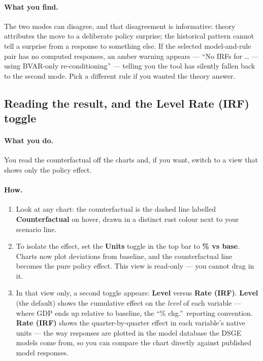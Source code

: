\documentclass[11pt]{article}
\theoremstyle{definition}
\theoremstyle{remark}
\begin{document}
\paragraph{What you find.} The two modes can disagree, and that disagreement
is informative: theory attributes the move to a deliberate policy surprise;
the historical pattern cannot tell a surprise from a response to something
else. If the selected model-and-rule pair has no computed responses, an amber
warning appears --- ``No IRFs for \ldots{} --- using BVAR-only
re-conditioning'' --- telling you the tool has silently fallen back to the
second mode. Pick a different rule if you wanted the theory answer.

\subsection{Reading the result, and the Level \textbar{} Rate (IRF) toggle}

\paragraph{What you do.} You read the counterfactual off the charts and, if
you want, switch to a view that shows only the policy effect.

\paragraph{How.}
\begin{enumerate}
  \item Look at any chart: the counterfactual is the dashed line labelled
    \textbf{Counterfactual} on hover, drawn in a distinct rust colour next to
    your scenario line.
  \item To isolate the effect, set the \textbf{Units} toggle in the top bar to
    \textbf{\% vs base}. Charts now plot deviations from baseline, and the
    counterfactual line becomes the pure policy effect. This view is
    read-only --- you cannot drag in it.
  \item In that view only, a second toggle appears: \textbf{Level} versus
    \textbf{Rate (IRF)}. \textbf{Level} (the default) shows the cumulative
    effect on the \emph{level} of each variable --- where GDP ends up
    relative to baseline, the ``\% chg.''\ reporting convention.
    \textbf{Rate (IRF)} shows the quarter-by-quarter effect in each
    variable's native units --- the way responses are plotted in the model
    database the DSGE models come from, so you can compare the chart directly
    against published model responses.
\end{enumerate}
\end{document}
